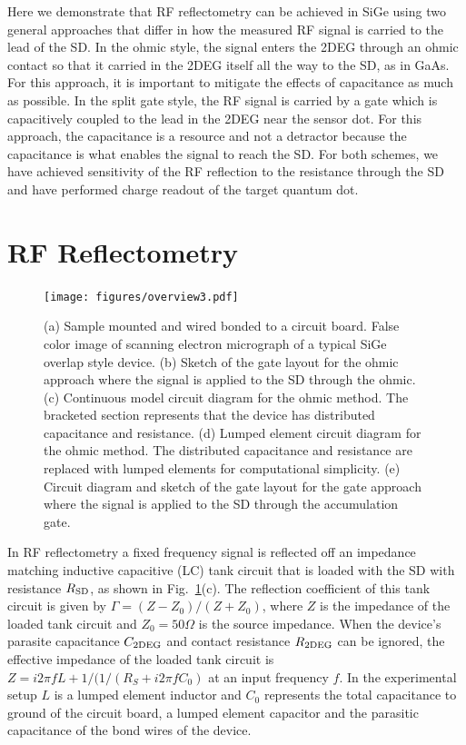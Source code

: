 \documentclass{article}
\begin{document}
	Here we demonstrate that RF reflectometry can be achieved in SiGe using two general approaches that differ in how the measured RF signal is carried to the lead of the SD.  In the ohmic style, the signal enters the 2DEG through an ohmic contact so that it carried in the 2DEG itself all the way to the SD, as in GaAs.  For this approach, it is important to mitigate the effects of capacitance as much as possible.  In the split gate style, the RF signal is carried by a gate which is capacitively coupled to the lead in the 2DEG near the sensor dot.  For this approach, the capacitance is a resource and not a detractor because the capacitance is what enables the signal to reach the SD.  For both schemes, we have achieved sensitivity of the RF reflection to the resistance through the SD and have performed charge readout of the target quantum dot.  
	
\section{RF Reflectometry}
	\label{sec:rf_reflectometry}


	\begin{figure}[h]
		\texttt{[image: figures/overview3.pdf]}
		\caption{(a) Sample mounted and wired bonded to a circuit board.  False color image of scanning electron micrograph of a typical SiGe overlap style device.  (b) Sketch of the gate layout for the ohmic approach where the signal is applied to the SD through the ohmic.  (c) Continuous model circuit diagram for the ohmic method.  The bracketed section represents that the device has distributed capacitance and resistance.  (d) Lumped element circuit diagram for the ohmic method.  The distributed capacitance and resistance are replaced with lumped elements for computational simplicity. (e) Circuit diagram and sketch of the gate layout for the gate approach where the signal is applied to the SD through the accumulation gate. }
		\label{fig:overview}
	\end{figure}


	\label{sub:why_sige_is_very_different_from_the_simples_reflectometry}
	In RF reflectometry a fixed frequency signal is reflected off an impedance matching inductive capacitive (LC) tank circuit that is loaded with the SD with resistance $R_{\rm SD}$, as shown in Fig.\ \ref{fig:overview}(c). The reflection coefficient of this tank circuit is given by $\Gamma=(Z-Z_0)/(Z+Z_0)$, where $Z$ is the impedance of the loaded tank circuit and $Z_0 = 50 \Omega$ is the source impedance. When the device's parasite capacitance $C_{\rm 2DEG}$ and contact resistance $R_{\rm 2DEG}$ can be ignored, the effective impedance of the loaded tank circuit is $Z = i2\pi fL + 1/(1/(R_S + i2\pi fC_0)$ at an input frequency $f$. In the experimental setup $L$ is a lumped element inductor and $C_0$ represents the total capacitance to ground of the circuit board, a lumped element capacitor and the parasitic capacitance of the bond wires of the device. 
\end{document}
